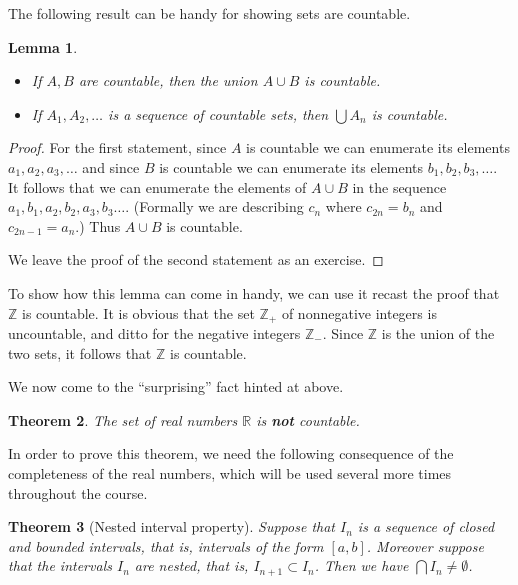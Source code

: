 \documentclass[11pt,oneside]{amsbook}
\newcommand{\Z}{\mathbb Z}
\newcommand{\R}{\mathbb R}
\theoremstyle{definition}
\theoremstyle{plain}
\newtheorem{thm}{Theorem}[section]
\newtheorem{lem}[thm]{Lemma}
\theoremstyle{definition}
\theoremstyle{remark}
\numberwithin{equation}{section}
\numberwithin{figure}{section}
\begin{document}
The following result can be handy for showing sets are countable.

\begin{lem}
  \begin{itemize}
  \item If $A,B$ are countable, then the union $A\cup B$ is countable.
  \item If $A_1,A_2,\ldots$ is a sequence of countable sets, then $\bigcup A_n$ is countable.
  \end{itemize}
\end{lem}

\begin{proof}
  For the first statement, since $A$ is countable we can enumerate its elements $a_1,a_2,a_3,\ldots$ and since $B$ is countable we can enumerate its elements $b_1,b_2,b_3,\ldots$. It follows that we can enumerate the elements of $A\cup B$ in the sequence $a_1,b_1,a_2,b_2,a_3,b_3\ldots$. (Formally we are describing $c_n$ where $c_{2n}=b_n$ and $c_{2n-1}=a_n$.) Thus $A\cup B$ is countable.

  We leave the proof of the second statement as an exercise.
\end{proof}

To show how this lemma can come in handy, we can use it recast the proof that $\Z$ is countable. It is obvious that the set $\Z_+$ of nonnegative integers is uncountable, and ditto for the negative integers $\Z_-$. Since $\Z$ is the union of the two sets, it follows that $\Z$ is countable.

We now come to the ``surprising'' fact hinted at above.

\begin{thm}
  \label{thm:reals-uncountable}
  The set of real numbers $\R$ is \textbf{not} countable.
\end{thm}

In order to prove this theorem, we need the following consequence of the completeness of the real numbers, which will be used several more times throughout the course.

\begin{thm}[Nested interval property]
  Suppose that $I_n$ is a sequence of closed and bounded intervals, that is, intervals of the form $[a,b]$. Moreover suppose that the intervals $I_n$ are nested, that is, $I_{n+1}\subset I_n$. Then we have $\bigcap I_n\neq\emptyset$.
\end{thm}
\end{document}
